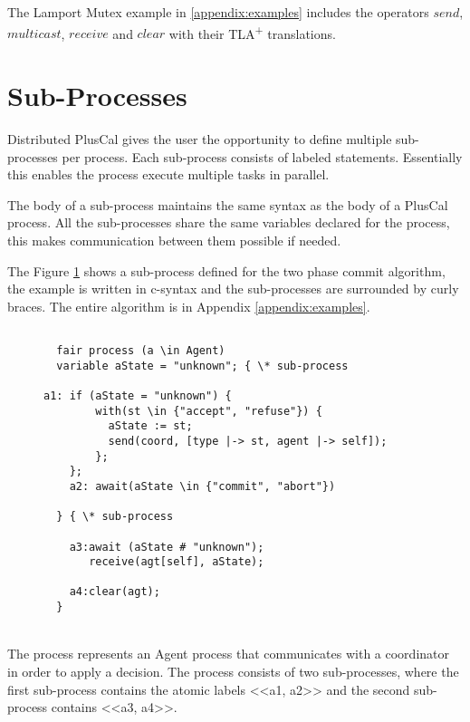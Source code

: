 \documentclass{thesul}
\newcommand{\tlaplus}{TLA\textsuperscript{+}\xspace}
\begin{document}
The Lamport Mutex example in \ref{appendix:examples} includes the operators $send$, $multicast$, $receive$ and $clear$ with their \tlaplus translations.

\section{Sub-Processes}
\label{subProcess}

Distributed PlusCal gives the user the opportunity to define multiple sub-processes per process. Each sub-process consists of labeled statements. Essentially this enables the process execute multiple tasks in parallel.

The body of a sub-process maintains the same syntax as the body of a PlusCal process. All the sub-processes share the same variables declared for the process, this makes communication between them possible if needed.

The Figure \ref{2pcSub} shows a sub-process defined for the two phase commit algorithm, the example is written in c-syntax and the sub-processes are surrounded by curly braces.
The entire algorithm is in Appendix \ref{appendix:examples}.

\begin{figure}[!h]
\label{2pcSub}
\begin{lstlisting}[caption = Distributed PlusCal Sub-Processes, frame = tlrb, firstnumber = 1]
   
  fair process (a \in Agent)
  variable aState = "unknown"; { \* sub-process

a1: if (aState = "unknown") {
        with(st \in {"accept", "refuse"}) {
          aState := st;
          send(coord, [type |-> st, agent |-> self]);
        };
    };
    a2: await(aState \in {"commit", "abort"})
    
  } { \* sub-process
    
    a3:await (aState # "unknown");
       receive(agt[self], aState); 
       
    a4:clear(agt);
  }

\end{lstlisting}
\end{figure}

\hfill\\

The process represents an Agent process that communicates with a coordinator in order to apply a decision. The process consists of two sub-processes, where the first sub-process contains the atomic labels <<a1, a2>> and the second sub-process contains <<a3, a4>>.
\end{document}
